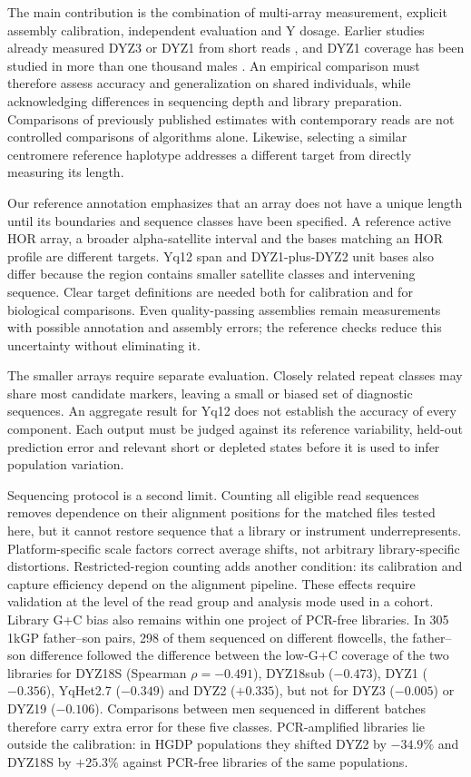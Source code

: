 \documentclass[pdflatex,sn-nature]{sn-jnl}
\begin{document}
The main contribution is the combination of multi-array measurement, explicit assembly calibration, independent evaluation and Y dosage. Earlier studies already measured DYZ3 or DYZ1 from short reads \cite{Miga2014,Altemose2014}, and DYZ1 coverage has been studied in more than one thousand males \cite{SanRoman2024}. An empirical comparison must therefore assess accuracy and generalization on shared individuals, while acknowledging differences in sequencing depth and library preparation. Comparisons of previously published estimates with contemporary reads are not controlled comparisons of algorithms alone. Likewise, selecting a similar centromere reference haplotype \cite{Shiraishi2026} addresses a different target from directly measuring its length.

Our reference annotation emphasizes that an array does not have a unique length until its boundaries and sequence classes have been specified. A reference active HOR array, a broader alpha-satellite interval and the bases matching an HOR profile are different targets. Yq12 span and DYZ1-plus-DYZ2 unit bases also differ because the region contains smaller satellite classes and intervening sequence. Clear target definitions are needed both for calibration and for biological comparisons. Even quality-passing assemblies remain measurements with possible annotation and assembly errors; the reference checks reduce this uncertainty without eliminating it.

The smaller arrays require separate evaluation. Closely related repeat classes may share most candidate markers, leaving a small or biased set of diagnostic sequences. An aggregate result for Yq12 does not establish the accuracy of every component. Each output must be judged against its reference variability, held-out prediction error and relevant short or depleted states before it is used to infer population variation.

Sequencing protocol is a second limit. Counting all eligible read sequences removes dependence on their alignment positions for the matched files tested here, but it cannot restore sequence that a library or instrument underrepresents. Platform-specific scale factors correct average shifts, not arbitrary library-specific distortions. Restricted-region counting adds another condition: its calibration and capture efficiency depend on the alignment pipeline. These effects require validation at the level of the read group and analysis mode used in a cohort. Library G+C bias also remains within one project of PCR-free libraries. In 305 1kGP father--son pairs, 298 of them sequenced on different flowcells, the father--son difference followed the difference between the low-G+C coverage of the two libraries for DYZ18S (Spearman $\rho=-0.491$), DYZ18sub ($-0.473$), DYZ1 ($-0.356$), YqHet2.7 ($-0.349$) and DYZ2 ($+0.335$), but not for DYZ3 ($-0.005$) or DYZ19 ($-0.106$). Comparisons between men sequenced in different batches therefore carry extra error for these five classes. PCR-amplified libraries lie outside the calibration: in HGDP populations they shifted DYZ2 by $-34.9\%$ and DYZ18S by $+25.3\%$ against PCR-free libraries of the same populations.
\end{document}
